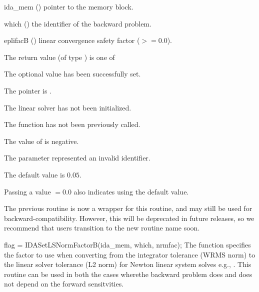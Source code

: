 {
  \begin{args}
  \item[ida\_mem] ()
    pointer to the {\idas} memory block.
  \item[which] ()
    the identifier of the backward problem.
  \item[eplifacB] ()
    linear convergence safety factor ($>= 0.0$).
  \end{args}
}
{
  The return value  (of type ) is one of
  \begin{args}
  \item[\Id{IDALS\_SUCCESS}]
    The optional value has been successfully set.
  \item[\Id{IDALS\_MEM\_NULL}]
    The  pointer is .
  \item[\Id{IDALS\_LMEM\_NULL}]
    The {\idals} linear solver has not been initialized.
  \item[\Id{IDALS\_NO\_ADJ}]
    The function  has not been previously called.
  \item[\Id{IDALS\_ILL\_INPUT}]
    The value of  is negative.
  \item[\Id{IDALS\_ILL\_INPUT}]
    The parameter  represented an invalid identifier.
  \end{args}
}
{
  The default value is $0.05$.

  Passing a value $ = 0.0$ also indicates using the default value.

  The previous routine  is now a
  wrapper for this routine, and may still be used for
  backward-compatibility.  However, this will be deprecated in future
  releases, so we recommend that users transition to the new routine
  name soon.
}
{
  flag = IDASetLSNormFactorB(ida\_mem, which, nrmfac);
}
{
  The function  specifies the factor to use when
  converting from the integrator tolerance (WRMS norm) to the linear solver
  tolerance (L2 norm) for Newton linear system solves e.g.,
  .
  This routine can be used in both the cases wherethe backward problem
  does and does not depend on the forward sensitvities.
}
